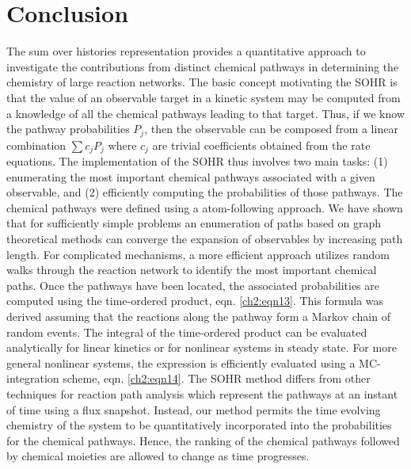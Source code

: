 \chapter{Conclusion}
\label{chapter5}
The sum over histories representation provides a quantitative approach to investigate
the contributions from distinct chemical pathways in determining the chemistry of large
reaction networks. The basic concept motivating the SOHR is that the value of an
observable target in a kinetic system may be computed from a knowledge of all the
chemical pathways leading to that target. Thus, if we know the pathway probabilities
$P_j$, then the observable can be composed from a linear combination $\sum{c_jP_j}$ where $c_j$ are
trivial coefficients obtained from the rate equations. The implementation of the SOHR
thus involves two main tasks: (1) enumerating the most important chemical pathways
associated with a given observable, and (2) efficiently computing the probabilities of
those pathways. The chemical pathways were defined using a atom-following approach.
We have shown that for sufficiently simple problems an enumeration of paths based on
graph theoretical methods can converge the expansion of observables by increasing
path length. For complicated mechanisms, a more efficient approach utilizes random
walks through the reaction network to identify the most important chemical paths. Once
the pathways have been located, the associated probabilities are computed using the
time-ordered product, eqn. \ref{ch2:eqn13}. This formula was derived assuming that the
reactions along the pathway form a Markov chain of random events. The integral of
the time-ordered product can be evaluated analytically for linear kinetics or for nonlinear
systems in steady state. For more general nonlinear systems, the expression is efficiently
evaluated using a MC-integration scheme, eqn. \ref{ch2:eqn14}. The SOHR method
differs from other techniques for reaction path analysis which represent the pathways at
an instant of time using a flux snapshot.\cite{ch3_17_kee2008chemkin} Instead, our method permits the time
evolving chemistry of the system to be quantitatively incorporated into the probabilities
for the chemical pathways. Hence, the ranking of the chemical pathways followed by
chemical moieties are allowed to change as time progresses.
\newline

